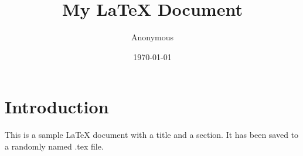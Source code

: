\documentclass{article}
\title{My LaTeX Document}
\author{Anonymous}
\date{\today}
\begin{document}
\maketitle

\section{Introduction}
This is a sample LaTeX document with a title and a section. It has been saved to a randomly named .tex file.
\end{document}
